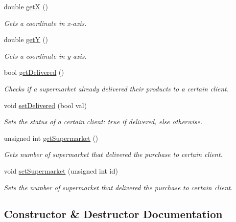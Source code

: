 \begin{DoxyCompactItemize}
double \hyperlink{class_info_vertex_ac9a026e3422d6d7f40942bfc049c90f3}{getX} ()
\begin{DoxyCompactList}\small\item\em Gets a coordinate in x-\/axis. \end{DoxyCompactList}\item 
double \hyperlink{class_info_vertex_a89c623b235ae7e76454ceface0e6ef6b}{getY} ()
\begin{DoxyCompactList}\small\item\em Gets a coordinate in y-\/axis. \end{DoxyCompactList}\item 
bool \hyperlink{class_info_vertex_a2027e7fc90081d97836e4fc3841814e6}{get\+Delivered} ()
\begin{DoxyCompactList}\small\item\em Checks if a supermarket already delivered their products to a certain client. \end{DoxyCompactList}\item 
void \hyperlink{class_info_vertex_aa4e371bf7f81fb5767f36fafafa03e4a}{set\+Delivered} (bool val)
\begin{DoxyCompactList}\small\item\em Sets the status of a certain client\+: true if delivered, else otherwise. \end{DoxyCompactList}\item 
unsigned int \hyperlink{class_info_vertex_a0c6525ccfca21f682c28697dcdab5882}{get\+Supermarket} ()
\begin{DoxyCompactList}\small\item\em Gets number of supermarket that delivered the purchase to certain client. \end{DoxyCompactList}\item 
void \hyperlink{class_info_vertex_a76710ab50065ffbb8d41bb998fe55a79}{set\+Supermarket} (unsigned int id)
\begin{DoxyCompactList}\small\item\em Sets the number of supermarket that delivered the purchase to certain client. \end{DoxyCompactList}\end{DoxyCompactItemize}


\subsection{Constructor \& Destructor Documentation}
\hypertarget{class_info_vertex_a2be3f8a7e1581a81d510c431daf18a27}{}\label{class_info_vertex_a2be3f8a7e1581a81d510c431daf18a27} 
